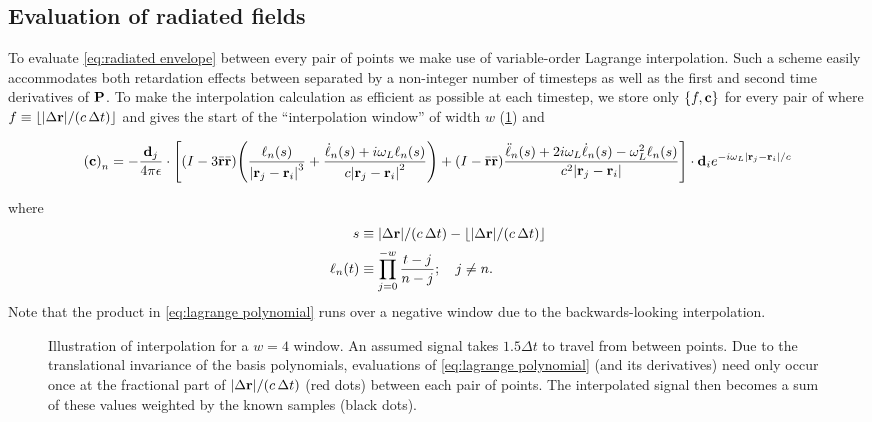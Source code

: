 \subsection{Evaluation of radiated fields}

To evaluate \cref{eq:radiated envelope} between every pair of points we make use of variable-order Lagrange interpolation.
Such a scheme easily accommodates both retardation effects between \qds{} separated by a non-integer number of timesteps as well as the first and second time derivatives of $\vb{P}$.
To make the interpolation calculation as efficient as possible at each timestep, we store only $\qty{f, \vb{c}}$ for every pair of \qds{} where
$f \equiv \lfloor \abs{\Delta \vb{r}}/(c \, \Delta t) \rfloor$ and gives the start of the ``interpolation window'' of width $w$ (\cref{fig:interpolation}) and
\begin{widetext}
\begin{equation}
  \qty(\vb{c})_n = -\frac{\vb{d}_j}{4\pi \epsilon} \cdot \qty[\qty(I - 3\bar{\vb{r}}\bar{\vb{r}}) \qty(\frac{\ell_n(s)}{\abs{\vb{r}_j - \vb{r}_i}^3} + \frac{\dot{\ell}_n(s) + i \omega_L \ell_n(s)}{c \abs{\vb{r}_j - \vb{r}_i}^2}) +
    \qty(I - \bar{\vb{r}}\bar{\vb{r}}) \frac{\ddot{\ell}_n(s) + 2i \omega_L \dot{\ell}_n(s) - \omega_L^2 \ell_n(s)}{c^2 \abs{\vb{r}_j - \vb{r}_i}}] \cdot \vb{d}_i e^{-i \omega_L \abs{\vb{r}_j - \vb{r}_i}/c}
    \label{eq:interpolation coefs}
\end{equation}
\end{widetext}
where
\begin{align}
  s         &\equiv \abs{\Delta \vb{r}}/\qty(c \, \Delta t) - \lfloor \abs{\Delta \vb{r}}/\qty(c \, \Delta t) \rfloor \label{eq:fractional part} \\
  \ell_n(t) &\equiv \prod_{j = 0}^{-w} \frac{t - j}{n - j}; \quad j \not = n. \label{eq:lagrange polynomial}
\end{align}
Note that the product in \cref{eq:lagrange polynomial} runs over a negative window due to the backwards-looking interpolation.

\begin{figure}
  
  \caption{\label{fig:interpolation}Illustration of interpolation for a $w = 4$ window.
    An assumed signal takes $1.5\Delta t$ to travel from between points.
    Due to the translational invariance of the basis polynomials, evaluations of \cref{eq:lagrange polynomial} (and its derivatives) need only occur once at the fractional part of $\abs{\Delta \vb{r}}/(c \, \Delta t)$ (red dots) between each pair of points.
    The interpolated signal then becomes a sum of these values weighted by the known samples (black dots).
  }
\end{figure}
